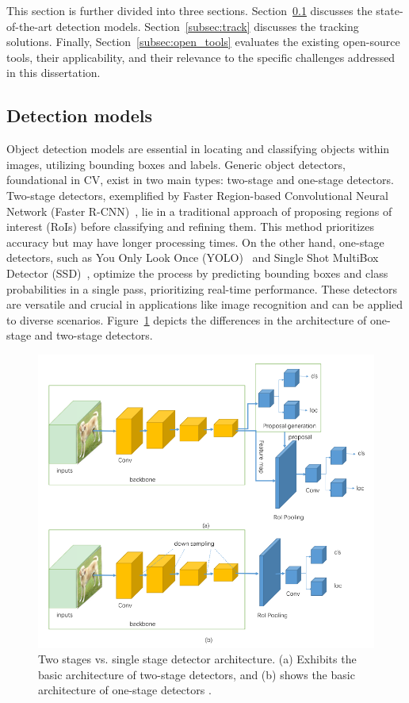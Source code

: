 This section is further divided into three sections.
Section~\ref{subsec:detect} discusses the state-of-the-art detection models.
Section~\ref{subsec:track} discusses the tracking solutions.
Finally, Section~\ref{subsec:open_tools} evaluates the existing open-source tools, their applicability, and their relevance to the specific challenges addressed in this dissertation.

\subsection{Detection models}\label{subsec:detect}

Object detection models are essential in locating and classifying objects within images, utilizing bounding boxes and labels.
Generic object detectors, foundational in CV, exist in two main types: two-stage and one-stage detectors.
Two-stage detectors, exemplified by Faster Region-based Convolutional Neural Network (Faster R-CNN)~\cite{FasterRCNN}, lie in a traditional approach of proposing regions of interest (RoIs) before classifying and refining them.
This method prioritizes accuracy but may have longer processing times.
On the other hand, one-stage detectors, such as You Only Look Once (YOLO)~\cite{YOLO} and Single Shot MultiBox Detector (SSD)~\cite{SSD}, optimize the process by predicting bounding boxes and class probabilities in a single pass, prioritizing real-time performance.
These detectors are versatile and crucial in applications like image recognition and can be applied to diverse scenarios.
Figure~\ref{fig:1vs2} depicts the differences in the architecture of one-stage and two-stage detectors.

\begin{figure}[H]
    \centering
    \includegraphics[width=0.6\linewidth]{figures/single vs two}
    \caption[Two stages vs. single stage detector architecture]{Two stages vs. single stage detector architecture. (a) Exhibits the basic architecture of two-stage detectors, and (b) shows the basic architecture of one-stage detectors \cite{1vs2}.}
    \label{fig:1vs2}
\end{figure}

